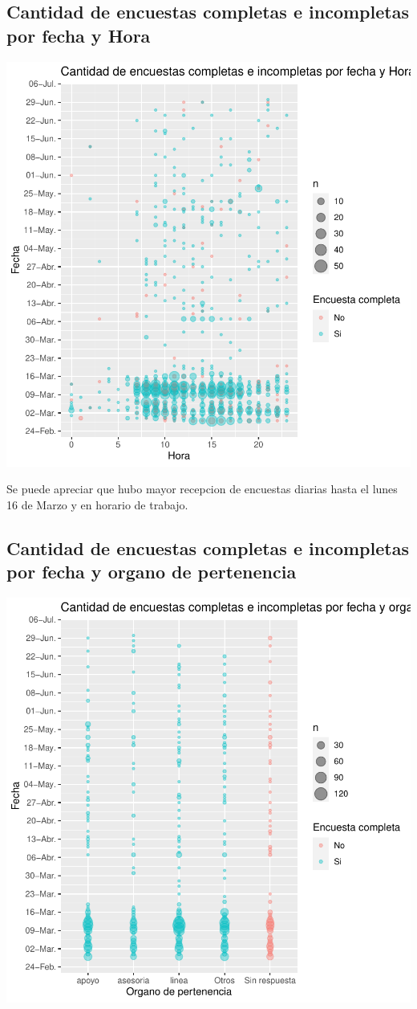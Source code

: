 \documentclass{article}
\begin{document}
\subsection{Cantidad de encuestas completas e incompletas por fecha y Hora}

\includegraphics{seguimientov3-003}

Se puede apreciar que hubo mayor recepcion de encuestas diarias hasta el lunes 16 de Marzo y en horario de trabajo.

\subsection{Cantidad de encuestas completas e incompletas por fecha y organo de pertenencia}

\includegraphics{seguimientov3-004}
\end{document}
